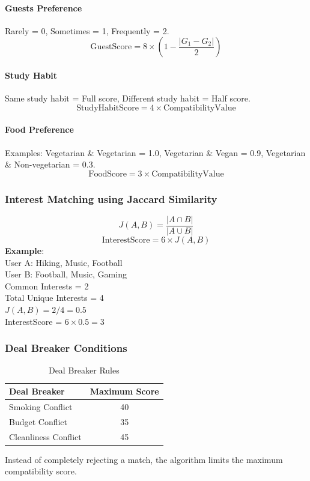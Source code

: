 \paragraph{Guests Preference}
Rarely = 0, Sometimes = 1, Frequently = 2.
\[
\text{GuestScore} = 8 \times \left(1 - \frac{|G_1 - G_2|}{2}\right)
\]

\paragraph{Study Habit}
Same study habit = Full score, Different study habit = Half score.
\[
\text{StudyHabitScore} = 4 \times \text{CompatibilityValue}
\]

\paragraph{Food Preference}
Examples: Vegetarian \& Vegetarian = 1.0, Vegetarian \& Vegan = 0.9, Vegetarian \& Non-vegetarian = 0.3.
\[
\text{FoodScore} = 3 \times \text{CompatibilityValue}
\]

\subsubsection{Interest Matching using Jaccard Similarity}
\[
J(A,B) = \frac{|A \cap B|}{|A \cup B|}
\]
\[
\text{InterestScore} = 6 \times J(A,B)
\]
\textbf{Example}: \\
User A: Hiking, Music, Football \\
User B: Football, Music, Gaming \\
Common Interests = 2 \\
Total Unique Interests = 4 \\
$J(A,B) = 2/4 = 0.5$ \\
InterestScore = $6 \times 0.5 = 3$

\subsubsection{Deal Breaker Conditions}
\begin{table}[H]
\centering
\begin{tabular}{|l|c|}
\hline
\textbf{Deal Breaker} &  \textbf{Maximum Score} \\
\hline
Smoking Conflict & 40 \\
Budget Conflict & 35 \\
Cleanliness Conflict & 45 \\
\hline
\end{tabular}
\caption{Deal Breaker Rules}
\label{table:deal_breakers}
\end{table}
Instead of completely rejecting a match, the algorithm limits the maximum compatibility score.

